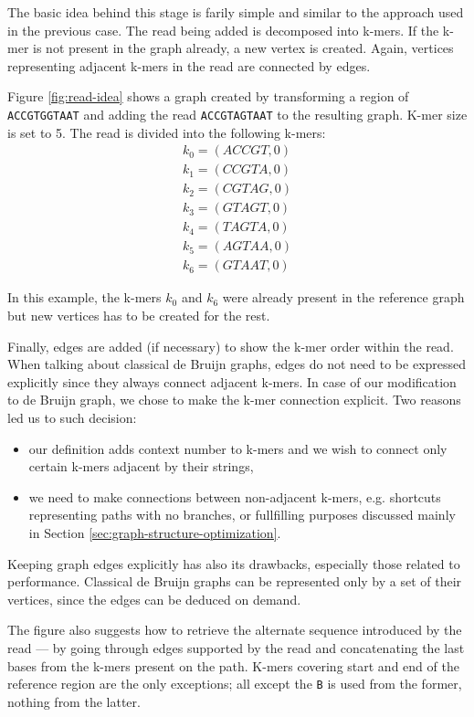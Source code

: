 The basic idea behind this stage is farily simple and similar to the approach used in the previous case. The read being added is decomposed into k-mers. If the k-mer is not present in the graph already, a new vertex is created. Again, vertices representing adjacent k-mers in the read are connected by edges. 

Figure \ref{fig:read-idea} shows a graph created by transforming a region of \texttt{ACCGTGGTAAT} and adding the read \texttt{ACCGTAGTAAT} to the resulting graph. K-mer size is set to 5. The read is divided into the following k-mers:
\begin{align}
k_0 = (ACCGT, 0) \\
k_1 = (CCGTA, 0) \\
k_2 = (CGTAG, 0) \\
k_3 = (GTAGT, 0) \\
k_4 = (TAGTA, 0) \\
k_5 = (AGTAA, 0) \\
k_6 = (GTAAT, 0)
\end{align}

In this example, the k-mers $k_0$ and $k_6$ were already present in the reference graph but new vertices has to be created for the rest.

Finally, edges are added (if necessary) to show the k-mer order within the read. When talking about classical de Bruijn graphs, edges do not need to be expressed explicitly since they always connect adjacent k-mers. In case of our modification to de Bruijn graph, we chose to make the k-mer connection explicit. Two reasons led us to such decision:
\begin{itemize}
\item our definition adds context number to k-mers and we wish to connect only certain k-mers adjacent by their strings,
\item we need to make connections between non-adjacent k-mers, e.g. shortcuts representing paths with no branches, or fullfilling purposes discussed mainly in Section \ref{sec:graph-structure-optimization}.
\end{itemize}
Keeping graph edges explicitly has also its drawbacks, especially those related to performance. Classical de Bruijn graphs can be represented only by a set of their vertices, since the edges can be deduced on demand.

The figure also suggests how to retrieve the alternate sequence introduced by the read --- by going through edges supported by the read and concatenating the last bases from the k-mers present on the path. K-mers covering start and end of the reference region are the only exceptions; all except the \texttt{B} is used from the former, nothing from the latter.


